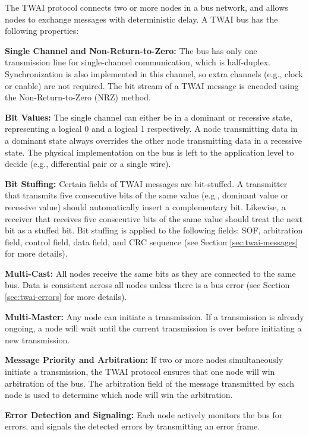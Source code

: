 \documentclass[main\_\_EN.tex]{subfiles}
\begin{document}
The TWAI protocol connects two or more nodes in a bus network, and allows nodes to exchange messages with deterministic delay. A TWAI bus has the following properties:

{\bfseries Single Channel and Non-Return-to-Zero:} The bus has only one transmission line for single-channel communication, which is half-duplex. Synchronization is also implemented in this channel, so extra channels (e.g., clock or enable) are not required. The bit stream of a TWAI message is encoded using the Non-Return-to-Zero (NRZ) method.

{\bfseries Bit Values:} The single channel can either be in a dominant or recessive state, representing a logical 0 and a logical 1 respectively. A node transmitting data in a dominant state always overrides the other node transmitting data in a recessive state. The physical implementation on the bus is left to the application level to decide (e.g., differential pair or a single wire).

{\bfseries Bit Stuffing:} Certain fields of TWAI messages are bit-stuffed. A transmitter that transmits five consecutive bits of the same value (e.g., dominant value or recessive value) should automatically insert a complementary bit. Likewise, a receiver that receives five consecutive bits of the same value should treat the next bit as a stuffed bit. Bit stuffing is applied to the following fields: SOF, arbitration field, control field, data field, and CRC sequence (see Section \ref{sec:twai-messages} for more details).

{\bfseries Multi-Cast:} All nodes receive the same bits as they are connected to the same bus. Data is consistent across all nodes unless there is a bus error (see Section \ref{sec:twai-errors} for more details).

{\bfseries Multi-Master:} Any node can initiate a transmission. If a transmission is already ongoing, a node will wait until the current transmission is over before initiating a new transmission.

{\bfseries Message Priority and Arbitration:} If two or more nodes simultaneously initiate a transmission, the TWAI protocol ensures that one node will win arbitration of the bus. The arbitration field of the message transmitted by each node is used to determine which node will win the arbitration.

{\bfseries Error Detection and Signaling:} Each node actively monitors the bus for errors, and signals the detected errors by transmitting an error frame.
\end{document}
